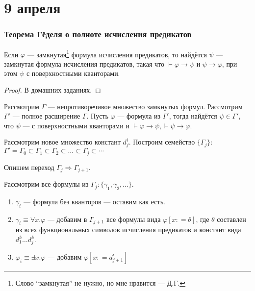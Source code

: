 \chapter{9 апреля}

\subsection{Теорема Гёделя о полноте исчисления предикатов}

\begin{theorem}
    Если \(\varphi\) --- замкнутая\footnote{Слово ``замкнутая'' не нужно, но мне нравится --- Д.Г.} формула исчисления предикатов, то найдётся \(\psi\) --- замкнутая формула исчисления предикатов, такая что \(\vdash \varphi \to \psi\) и \(\psi \to \varphi\), при этом \(\psi\) с поверхностными кванторами.
\end{theorem}
\begin{proof}
    В домашних заданиях.
\end{proof}

Рассмотрим \(\Gamma\) --- непротиворечивое множество замкнутых формул. Рассмотрим \(\Gamma'\) --- полное расширение \(\Gamma\). Пусть \(\varphi\) --- формула из \(\Gamma'\), тогда найдётся \(\psi \in \Gamma'\), что \(\psi\) --- с поверхностными кванторами и \(\vdash \varphi \to \psi, \vdash \psi \to \varphi\).

Рассмотрим новое множество констант \(d_j^i\). Построим семейство \(\{\Gamma_j\}\): \(\Gamma' = \Gamma_0 \subset \Gamma_1 \subset \Gamma_2 \subset \dots \subset \Gamma_j \subset \cdots\)

Опишем переход \(\Gamma_j \Rightarrow \Gamma_{j + 1}\).

Рассмотрим все формулы из \(\Gamma_j : \{\gamma_1, \gamma_2, \dots\}\).
\begin{enumerate}
    \item \(\gamma_i\) --- формула без кванторов --- оставим как есть.
    \item \(\gamma_i \equiv \forall x.\varphi\) --- добавим в \(\Gamma_{j + 1}\) все формулы вида \(\varphi[x: = \theta]\), где \(\theta\) составлен из всех функциональных символов исчисления предикатов и констант вида \(d_1^k \dots d_j^k\).
    \item \(\varphi_i \equiv \exists x.\varphi\) --- добавим \(\varphi[x: = d^i_{j + 1}]\)
\end{enumerate}

